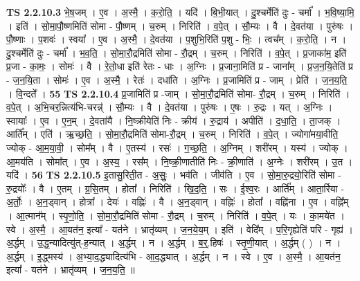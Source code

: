 \documentclass[17pt]{extarticle}
\begin{document}
                  \newline
                                \textbf{ TS 2.2.10.3} \newline
                  भे॒ष॒जम् । ए॒व । अ॒स्मै॒ । क॒रो॒ति॒ । यदि॑ । बि॒भी॒यात् । दु॒श्चर्मेति॑ दुः - चर्मा᳚ । भ॒वि॒ष्या॒मि॒ । इति॑ । सो॒मा॒पौ॒ष्णमिति॑ सोमा - पौ॒ष्णम् । च॒रुम् । निरिति॑ । व॒पे॒त् । सौ॒म्यः । वै । दे॒वत॑या । पुरु॑षः । पौ॒ष्णाः । प॒शवः॑ । स्वया᳚ । ए॒व । अ॒स्मै॒ । दे॒वत॑या । प॒शुभि॒रिति॑ प॒शु - भिः॒ । त्वच᳚म् । क॒रो॒ति॒ । न । दु॒श्चर्मेति॑ दुः - चर्मा᳚ । भ॒व॒ति॒ । सो॒मा॒रौ॒द्रमिति॑ सोमा - रौ॒द्रम् । च॒रुम् । निरिति॑ । व॒पे॒त् । प्र॒जाका॑म॒ इति॑ प्र॒जा - का॒मः॒ । सोमः॑ । वै । रे॒तो॒धा इति॑ रेतः - धाः । अ॒ग्निः । प्र॒जाना॒मिति॑ प्र - जाना᳚म् । प्र॒ज॒न॒यि॒तेति॑ प्र - ज॒न॒यि॒ता । सोमः॑ । ए॒व । अ॒स्मै॒ । रेतः॑ । दधा॑ति । अ॒ग्निः । प्र॒जामिति॑ प्र - जाम् । प्रेति॑ । ज॒न॒य॒ति॒ । वि॒न्दते᳚ । \textbf{  55} \newline
                  \newline
                                \textbf{ TS 2.2.10.4} \newline
                  प्र॒जामिति॑ प्र -जाम् । सो॒मा॒रौ॒द्रमिति॑ सोमा- रौ॒द्रम् । च॒रुम् । निरिति॑ । व॒पे॒त् । अ॒भि॒चर॒न्नित्य॑भि-चरन्न्॑ । सौ॒म्यः । वै । दे॒वत॑या । पुरु॑षः । ए॒षः । रु॒द्रः । यत् । अ॒ग्निः । स्वायाः᳚ । ए॒व । ए॒न॒म् । दे॒वता॑यै । नि॒ष्क्रीयेति॑ निः - क्रीय॑ । रु॒द्राय॑ । अपीति॑ । द॒धा॒ति॒ । ता॒जक् । आर्ति᳚म् । एति॑ । ऋ॒च्छ॒ति॒ । सो॒मा॒रौ॒द्रमिति॑ सोमा-रौ॒द्रम् । च॒रुम् । निरिति॑ । व॒पे॒त् । ज्योगा॑मया॒वीति॒ ज्योक् - आ॒म॒या॒वी॒ । सोम᳚म् । वै । ए॒तस्य॑ । रसः॑ । ग॒च्छ॒ति॒ । अ॒ग्निम् । शरी॑रम् । यस्य॑ । ज्योक् । आ॒मय॑ति । सोमा᳚त् । ए॒व । अ॒स्य॒ । रस᳚म् । नि॒ष्क्री॒णातीति॑ निः - क्री॒णाति॑ । अ॒ग्नेः । शरी॑रम् । उ॒त । यदि॑ । \textbf{  56} \newline
                  \newline
                                \textbf{ TS 2.2.10.5} \newline
                  इ॒तासु॒रिती॒त - अ॒सुः॒ । भव॑ति । जीव॑ति । ए॒व । सो॒मा॒रु॒द्रयो॒रिति॑ सोमा - रु॒द्रयोः᳚ । वै । ए॒तम् । ग्र॒सि॒तम् । होता᳚ । निरिति॑ । खि॒द॒ति॒ । सः । ई॒श्व॒रः । आर्ति᳚म् । आता॒र्रिया - अ॒र्तोः॒ । अ॒न॒ड्वान् । होत्रा᳚ । देयः॑ । वह्निः॑ । वै । अ॒न॒ड्वान् । वह्निः॑ । होता᳚ । वह्नि॑ना । ए॒व । वह्नि᳚म् । आ॒त्मान᳚म् । स्पृ॒णो॒ति॒ । सो॒मा॒रौ॒द्रमिति॑ सोमा - रौ॒द्रम् । च॒रुम् । निरिति॑ । व॒पे॒त् । यः । का॒मये॑त । स्वे । अ॒स्मै॒ । आ॒यत॑न॒ इत्या᳚ - यत॑ने । भ्रातृ॑व्यम् । ज॒न॒ये॒य॒म् । इति॑ । वेदि᳚म् । प॒रि॒गृह्येति॑ परि - गृह्य॑ । अ॒र्द्धम् । उ॒द्ध॒न्यादित्यु॑त्-ह॒न्यात् । अ॒र्द्धम् । न । अ॒र्द्धम् । ब॒र्॒.हिषः॑ । स्तृ॒णी॒यात् । अ॒र्द्धम् ( ) । न । अ॒र्द्धम् । इ॒॒द्ध्मस्य॑ । अ॒भ्या॒द॒द्ध्यादित्य॑भि - आ॒द॒द्ध्यात् । अ॒र्द्धम् । न । स्वे । ए॒व । अ॒स्मै॒ । आ॒यत॑न॒ इत्या᳚ - यत॑ने । भ्रातृ॑व्यम् । ज॒न॒य॒ति॒ ॥ \textbf{ } \newline
\end{document}
